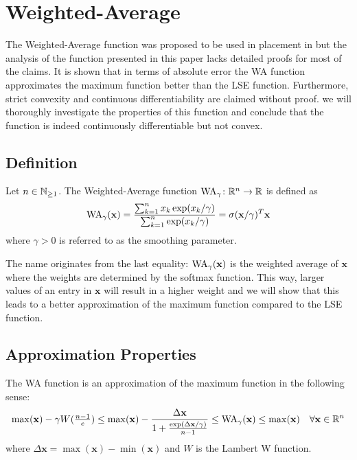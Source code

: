 \section{Weighted-Average} \label{sec:theoretical_properties_of_WA}

The Weighted-Average function was proposed to be used in placement in \cite{HsuChangBalabanov-AnalyticalPlacementFor3dIcDesigns}
but the analysis of the function presented in this paper lacks detailed proofs for most of the claims.
It is shown that in terms of absolute error the WA function approximates the maximum function better than the LSE function.
Furthermore, strict convexity and continuous differentiability are claimed without proof.
we will thoroughly investigate the properties of this function and
conclude that the function is indeed continuously differentiable but not convex.


\subsection{Definition} \label{sec:WA_definition}


\begin{definition} \label{def:WA}
 Let \(n \in \mathbb{N}_{\geq 1}\). The Weighted-Average function \(\operatorname{WA}_\gamma \colon \mathbb{R}^n \to \mathbb{R}\) is defined as
 \[ \operatorname{WA}_\gamma(\mathbf{x}) = \frac{\sum_{k=1}^n x_k \exp(x_k / \gamma)}{\sum_{k=1}^n \exp(x_k / \gamma)} = \sigma(\mathbf{x} / \gamma)^T \mathbf{x} \]
 where \(\gamma > 0\) is referred to as the smoothing parameter.
\end{definition}


\begin{remark}
 The name originates from the last equality:
 \(\operatorname{WA}_\gamma(\mathbf{x})\) is the weighted average of \(\mathbf{x}\) where the weights are determined by the softmax function.
 This way, larger values of an entry in \(\mathbf{x}\) will result in a higher weight
 and we will show that this leads to a better approximation of the maximum function compared to the LSE function.
\end{remark}



\subsection{Approximation Properties} \label{sec:WA_approximation_properties}

\begin{theorem} \label{thm:WA_approximates_max}
 The WA function is an approximation of the maximum function in the following sense:
 \[ \max (\mathbf{x}) - \gamma W (\tfrac{n-1}{e}) \leq \max (\mathbf{x}) - \frac{\Delta \mathbf{x}}{1 + \frac{\exp(\Delta \mathbf{x} / \gamma)}{n-1}} \leq \operatorname{WA}_\gamma (\mathbf{x}) \leq \max (\mathbf{x}) \quad \forall \mathbf{x} \in \mathbb{R}^n \]
 where \(\Delta \mathbf{x} = \max(\mathbf{x}) - \min(\mathbf{x})\) and \(W\) is the Lambert W function.
\end{theorem}

